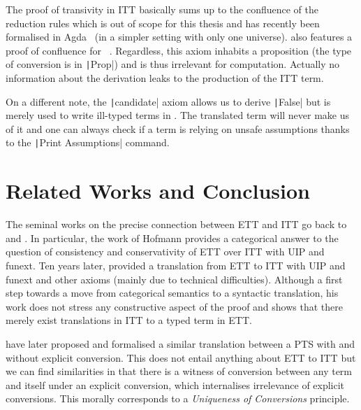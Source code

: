 The proof of transivity in \acrshort{ITT} basically sums up to the confluence of
the reduction rules which is out of scope for this thesis and has
recently been formalised in Agda~ (in a
simpler setting with only one universe).
\MetaCoq also features a proof of confluence for
\Coq~.
Regardless, this axiom inhabits a proposition (the type of conversion is in
\texttt|Prop|) and is thus irrelevant for computation. Actually no
information about the derivation leaks to the production of the \acrshort{ITT}
term.

On a different note, the \texttt|candidate| axiom allows us to derive
\texttt|False| but is merely used to write ill-typed terms in \Coq.
The translated term will never make us of it and one can always check if a
term is relying on unsafe assumptions thanks to the
\texttt|Print Assumptions| command.

\section{Related Works and Conclusion}
\label{sec:related-works}

The seminal works on the precise connection between \acrshort{ETT} and
\acrshort{ITT} go back to  and
.
%
In particular, the work of Hofmann provides a categorical answer to
the question of consistency and conservativity of \acrshort{ETT} over
\acrshort{ITT} with \acrshort{UIP} and \acrshort{funext}.
%
Ten years later,  provided
a translation from \acrshort{ETT} to \acrshort{ITT} with
\acrshort{UIP} and \acrshort{funext} and other axioms (mainly due to
technical difficulties).
%
Although a first step towards a move from categorical semantics to a
syntactic translation, his work does not stress any constructive
aspect of the proof and shows that there merely exist translations in
\acrshort{ITT} to a typed term in \acrshort{ETT}.

 have later proposed and
formalised a similar translation between a \acrshort{PTS} with and without
explicit conversion. This does not entail anything about \acrshort{ETT} to
\acrshort{ITT} but we can find similarities in that there is a witness of
conversion between any term and itself under an explicit conversion, which
internalises irrelevance of explicit conversions. This morally corresponds to a
\emph{Uniqueness of Conversions} principle.

